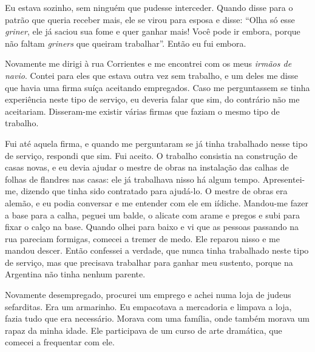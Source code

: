 Eu estava sozinho, sem ninguém que pudesse interceder. Quando disse
para o patrão que queria receber mais, ele se virou para esposa e
disse: ``Olha só esse \textit{griner}, ele já saciou sua fome e quer
ganhar mais! Você pode ir embora, porque não faltam \textit{griners} que
queiram trabalhar''. Então eu fui embora.

Novamente me dirigi à rua Corrientes e me encontrei com os meus \textit{irmãos
de navio}. Contei para eles que estava outra vez sem trabalho, e um
deles me disse que havia uma firma suíça aceitando empregados. 
Caso me perguntassem se tinha experiência neste
tipo de serviço, eu deveria falar que sim, do contrário não me
aceitariam. Disseram-me existir várias firmas que faziam o mesmo
tipo de trabalho.

Fui até aquela firma, e quando me perguntaram se já tinha
trabalhado nesse tipo de serviço, respondi que sim. Fui aceito. O
trabalho consistia na construção de casas novas, e eu devia ajudar o mestre
de obras na instalação das calhas de folhas de flandres nas casas: ele já trabalhava nisso há algum tempo. 
Apresentei-me, dizendo
que tinha sido contratado para ajudá-lo. O mestre de obras era alemão, e eu
podia conversar e me entender com ele em iídiche. Mandou-me fazer a base
para a calha, peguei um balde, o alicate com arame e pregos e subi para
fixar o calço na base. Quando olhei para baixo e vi que as pessoas
passando na rua pareciam formigas, comecei a tremer de medo. Ele
reparou nisso e me mandou descer. Então confessei a verdade, que
nunca tinha trabalhado neste tipo de serviço, mas que precisava
trabalhar para ganhar meu sustento, porque na Argentina não
tinha nenhum parente.


Novamente desempregado, procurei um emprego e achei numa loja de judeus
sefarditas. Era um armarinho. Eu empacotava a
mercadoria e limpava a loja, fazia tudo que era necessário. Morava com
uma família, onde também morava um rapaz da minha idade. Ele
participava de um curso de arte dramática, que comecei a frequentar com ele.

